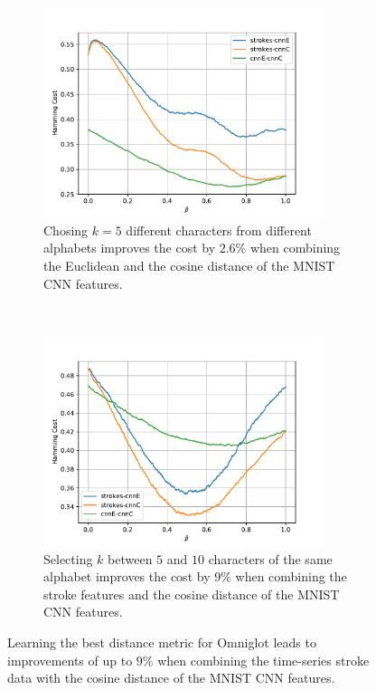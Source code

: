 \begin{figure}[H]
  \begin{subfigure}[b]{0.5\textwidth}
    \centering
    \includegraphics[width=0.9\textwidth]{plots/omniglot_MAML_results}
    \caption{Chosing $k=5$ different characters from different alphabets improves the cost by $2.6\%$ when combining the Euclidean and the cosine distance of the MNIST CNN features.}
    \label{fig:dl-omniglot-maml}
  \end{subfigure}
  ~
  \begin{subfigure}[b]{0.5\textwidth}
    \centering
    \includegraphics[width=0.9\textwidth]{plots/omniglot_MD2_results}
    \caption{Selecting $k$ between $5$ and $10$ characters of the same alphabet improves the cost by $9\%$ when combining the stroke features and the cosine distance of the MNIST CNN features.}
    \label{fig:dl-omniglot-md}
  \end{subfigure}
  \caption{Learning the best distance metric for Omniglot leads to improvements of up to $9\%$ when combining the time-series stroke data with the cosine distance of the MNIST CNN features.}
  \label{fig:dl-omniglot}
\end{figure}
